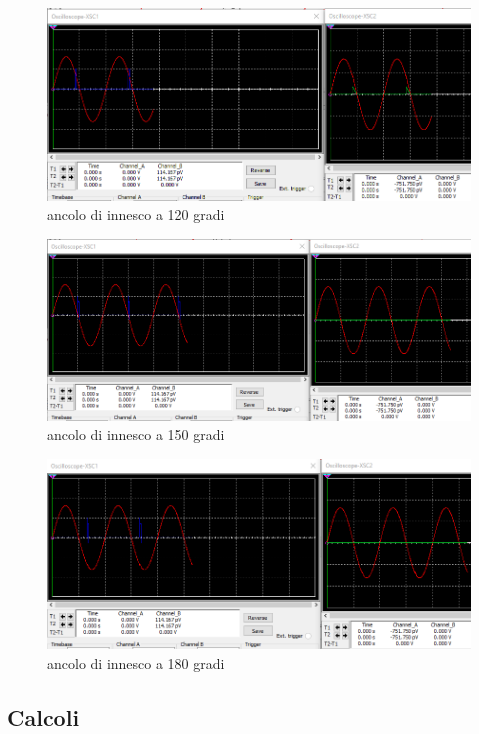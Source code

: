 \documentclass[12pt]{article}
\begin{document}
\begin{center}
\begin{figure}[H]
    \caption{ancolo di innesco a 120 gradi}
    \includegraphics[scale=0.7]{Grafico 120.PNG}
\end{figure}


\begin{figure}[H]
    \caption{ancolo di innesco a 150 gradi}
    \includegraphics[scale=0.7]{Grafico 150.PNG}
\end{figure}

\begin{figure}[H]
    \caption{ancolo di innesco a 180 gradi}
    \includegraphics[scale=0.7]{Grafico 180.PNG}
\end{figure}

\end{center}
\newpage
\subsection{Calcoli}
\end{document}
